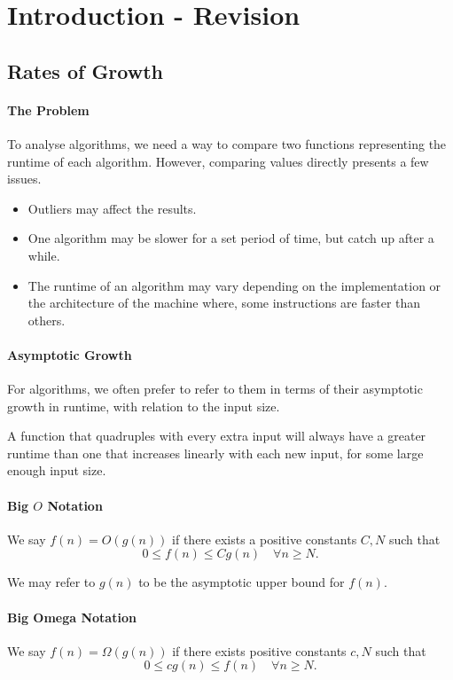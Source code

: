 
\section{Introduction - Revision}

\subsection{Rates of Growth}

\paragraph{The Problem}

To analyse algorithms, we need a way to compare two functions representing
the runtime of each algorithm. However, comparing values directly presents a few issues.
\begin{itemize}
    \item Outliers may affect the results.
    \item One algorithm may be slower for a set period of time, but catch
    up after a while.
    \item The runtime of an algorithm may vary depending on the
    implementation or the architecture of the machine where, some
    instructions are faster than others.
\end{itemize}

\paragraph{Asymptotic Growth}
For algorithms, we often prefer to refer to them in terms of their
asymptotic growth in runtime, with relation to the input size.

A function that quadruples with every extra input will always have a
greater runtime than one that increases linearly with each new input, for
some large enough input size.

\paragraph{Big \(O\) Notation}
We say \(f(n) = O(g(n))\) if there exists a positive constants \(C, N\)
such that
\[
    0 \leq f(n) \leq C g(n) \quad \forall n \geq N.
\]

We may refer to \(g(n)\) to be the asymptotic upper bound for \(f(n)\).

\paragraph{Big Omega Notation}
We say \(f(n) = \Omega(g(n))\) if there exists positive constants \(c, N\) such that 
\[0 \leq c g(n) \leq f(n) \quad \forall n \geq N.\]

